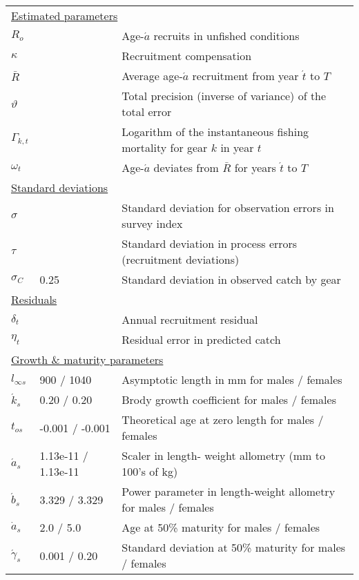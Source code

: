 \documentclass[11pt]{article}   %
\def\newp{\vfill \break}
\begin{document}
\begin{tabular}{lll}
\multicolumn{3}{l}{\underline{Estimated parameters}}\\
$R_o$               & & Age-$\acute{a}$ recruits in unfished conditions\\
$\kappa$            & & Recruitment compensation\\
$\bar{R}$           & & Average age-$\acute{a}$ recruitment from year $\acute{t}$ to $T$\\
$\vartheta$         & & Total precision (inverse of variance) of the total error\\
$\Gamma_{k,t}$    & & Logarithm of the instantaneous fishing mortality for gear $k$ in year $t$\\
$\omega_t$          & & Age-$\acute{a}$ deviates from $\bar{R}$ for years $\acute{t}$ to $T$\\
\multicolumn{3}{l}{\underline{Standard deviations}}\\
$\sigma$            &       & Standard deviation for observation errors in survey index\\
$\tau$              &       & Standard deviation in process errors (recruitment deviations)\\
$\sigma_C$          &0.25 & Standard deviation in observed catch by gear\\
\multicolumn{3}{l}{\underline{Residuals}}\\
$\delta_t$      &   & Annual recruitment residual\\
$\eta_t$        &   & Residual error in predicted catch\\
\multicolumn{3}{l}{\underline{Growth \& maturity parameters}}\\
$l_{\infty  s}$ &  900 / 1040 &  Asymptotic length in mm for males / females \\
$\acute{k}_s$ & 0.20 / 0.20 & Brody growth coefficient for males / females \\
$t_{o s}$ & -0.001 / -0.001 & Theoretical age at zero length for males / females \\
$\acute{a}_s$ & 1.13e{-11} / 1.13e{-11} &  Scaler in length- weight allometry (mm to 100's of kg)\\
$\acute{b}_s$ & 3.329 / 3.329 &Power parameter in length-weight allometry for males / females\\
$\dot{a}_s$ & 2.0 / 5.0 & Age at 50\% maturity for males / females \\
$\acute{\gamma}_s$ & 0.001 / 0.20 & Standard deviation at 50\% maturity for males / females\\
\hline
\end{tabular}
\newp %
\end{document}
